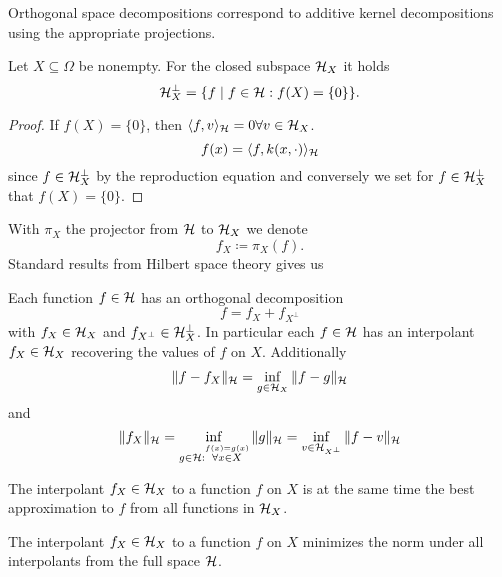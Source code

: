 \begin{remark}
    Orthogonal space decompositions correspond to additive kernel decompositions using the appropriate
    projections.
\end{remark}

\begin{theorem}\label{thm:1.16}
    Let $X\subseteq\Omega$ be nonempty. 
    For the closed subspace $\mathcal{H}_X$ it holds 
    \[\mathcal{H}_X^\perp=\{f\mid f\in \mathcal{H}: f(X)=\{0\}\}.\]
\end{theorem}

\begin{proof}
    If $f(X)=\{0\}$, then $\langle f,v\rangle_{\mathcal{H}}=0\forall v\in \mathcal{H}_X$.
    \[f(x)=\langle f,k(x,\cdot)\rangle_{\mathcal{H}}\]
    since $f\in\mathcal{H}_X^\perp$ by the reproduction equation and conversely we set for 
    $f\in\mathcal{H}_X^\perp$ that $f(X)=\{0\}$.
\end{proof}

With $\pi_X$ the projector from $\mathcal{H}$ to $\mathcal{H}_X$ we denote 
\[f_X\coloneqq \pi_X(f).\]
Standard results from Hilbert space theory gives us 
\begin{theorem}\label{thm:1.17}
    Each function $f\in\mathcal{H}$ has an orthogonal decomposition 
    \[f=f_X+f_{X^\perp}\]
    with $f_X\in\mathcal{H}_X$ and $f_{X^\perp}\in\mathcal{H}_X^\perp$. In particular 
    each $f\in \mathcal{H}$ has an interpolant $f_X\in\mathcal{H}_X$ recovering the values of $f$ on $X$.
    Additionally 
    \begin{align*}
        \Vert f-f_X\Vert_{\mathcal{H}}=\inf_{g\in\mathcal{H}_X} \Vert f-g\Vert_{\mathcal{H}}
    \end{align*}
    and 
    \[\Vert f_X\Vert_{\mathcal{H}}=\inf_{g\in\mathcal{H}:\stackrel{f(x)=g(x)}{\forall x\in X}}\Vert g\Vert_{\mathcal{H}}=\inf_{v\in\mathcal{H}_{X^\perp}}\Vert f-v\Vert_{\mathcal{H}}\]
\end{theorem}

\begin{corollary}\label{cor:1.18}
    The interpolant $f_X\in\mathcal{H}_X$ to a function $f$ on $X$ is at the same time 
    the best approximation to $f$ from all functions in $\mathcal{H}_X$.    
\end{corollary}

\begin{corollary}\label{cor:1.19}
    The interpolant $f_X\in\mathcal{H}_X$ to a function $f$ on $X$ minimizes the norm 
    under all interpolants from the full space $\mathcal{H}$.
\end{corollary}

